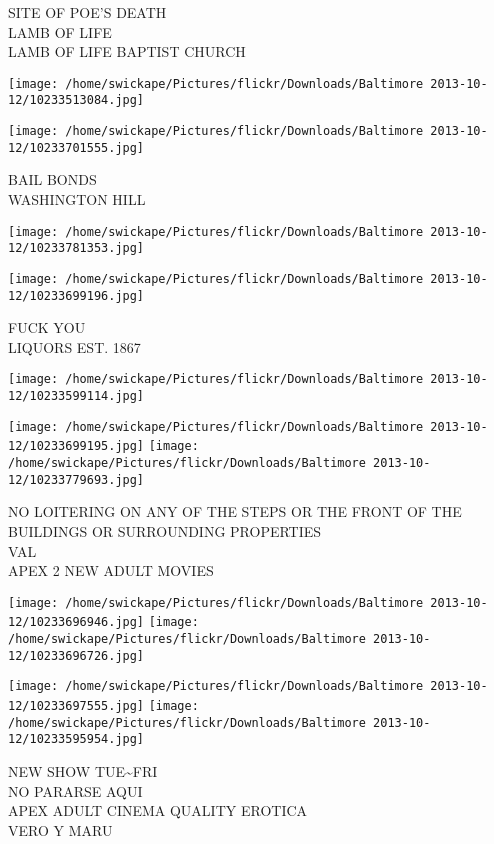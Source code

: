\documentclass[10pt,letterpaper]{article}
\begin{document}
SITE OF POE'S DEATH\\
LAMB OF LIFE\\
LAMB OF LIFE BAPTIST CHURCH
\pagebreak

\texttt{[image: /home/swickape/Pictures/flickr/Downloads/Baltimore 2013-10-12/10233513084.jpg]}

\vspace{0.25in}
\texttt{[image: /home/swickape/Pictures/flickr/Downloads/Baltimore 2013-10-12/10233701555.jpg]}

BAIL BONDS\\
WASHINGTON HILL
\pagebreak

\texttt{[image: /home/swickape/Pictures/flickr/Downloads/Baltimore 2013-10-12/10233781353.jpg]}

\vspace{0.25in}
\texttt{[image: /home/swickape/Pictures/flickr/Downloads/Baltimore 2013-10-12/10233699196.jpg]}

FUCK YOU\\
LIQUORS EST. 1867
\pagebreak

\texttt{[image: /home/swickape/Pictures/flickr/Downloads/Baltimore 2013-10-12/10233599114.jpg]}

\vspace{0.25in}
\texttt{[image: /home/swickape/Pictures/flickr/Downloads/Baltimore 2013-10-12/10233699195.jpg]}
\texttt{[image: /home/swickape/Pictures/flickr/Downloads/Baltimore 2013-10-12/10233779693.jpg]}

NO LOITERING ON ANY OF THE STEPS OR THE FRONT OF THE BUILDINGS OR SURROUNDING PROPERTIES\\
VAL\\
APEX 2 NEW ADULT MOVIES
\pagebreak

\texttt{[image: /home/swickape/Pictures/flickr/Downloads/Baltimore 2013-10-12/10233696946.jpg]}
\texttt{[image: /home/swickape/Pictures/flickr/Downloads/Baltimore 2013-10-12/10233696726.jpg]}

\texttt{[image: /home/swickape/Pictures/flickr/Downloads/Baltimore 2013-10-12/10233697555.jpg]}
\texttt{[image: /home/swickape/Pictures/flickr/Downloads/Baltimore 2013-10-12/10233595954.jpg]}

NEW SHOW TUE\textasciitilde{}FRI\\
NO PARARSE AQUI\\
APEX ADULT CINEMA QUALITY EROTICA\\
VERO Y MARU
\pagebreak
\end{document}
